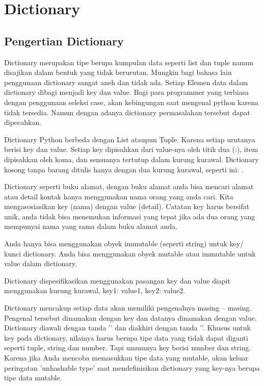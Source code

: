 \section{Dictionary}
\subsection{Pengertian Dictionary}
Dictionary merupakan tipe berupa kumpulan data seperti list dan tuple namun disajikan dalam bentuk yang tidak berurutan. Mungkin bagi bahasa lain penggunaan 
dictionary sangat aneh dan tidak ada. Setiap Elemen data dalam dictionary dibagi menjadi key dan value. Bagi para programmer yang terbiasa dengan penggunaan seleksi case, akan kebingungan saat mengenal 
python karena tidak tersedia. Namun dengan adanya dictionary permasalahan tersebut dapat dipecahkan.

Dictionary Python berbeda dengan List ataupun Tuple. Karena setiap urutanya berisi key dan value. Setiap key dipisahkan dari value-nya oleh titik dua (:), item dipisahkan oleh koma, dan semuanya tertutup dalam kurung kurawal. Dictionary kosong tanpa barang ditulis hanya dengan dua kurung kurawal, seperti ini: {}.

Dictionary seperti buku alamat, dengan buku alamat anda bisa mencari alamat atau detail kontak hanya menggunakan nama orang yang anda cari. Kita mengasosiasikan key (nama) dengan value (detail). Catatan key harus bersifat unik, anda tidak bisa menemukan informasi yang tepat jika ada dua orang yang mempunyai nama yang sama dalam buku alamat anda.

Anda hanya bisa menggunakan obyek immutable (seperti string) untuk key/ kunci dictionary. Anda bisa menggunakan obyek mutable atau immutable untuk value dalam dictionary.

Dictionary dispesifikasikan menggunakan pasangan key dan value diapit menggunakan kurung kurawal, {key1: value1, key2: value2}.


Dictionary mencakup setiap data akan memiliki pengenalnya masing – masing. Pengenal tersebut dinamakan dengan key dan datanya dinamakan dengan value.
Dictionary diawali dengan tanda '{' dan diakhiri dengan tanda '}'. Khusus untuk key pada dictionary, nilainya harus berupa tipe data yang tidak dapat diganti seperti tuple, string dan number. Tapi umumnya key berisi number dan string. Karena jika Anda mencoba memasukkan tipe data yang mutable, akan keluar peringatan 'unhashable type' saat mendefinisikan dictionary yang key-nya
berupa tipe data mutable.

